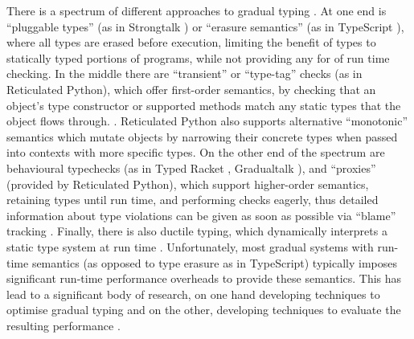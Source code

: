 \documentclass[sigplan,10pt,review,screen]{acmart}\settopmatter{printfolios=true}
\begin{document}
There is a spectrum of different approaches to gradual typing
\cite{kafka18,bensurvey18icfp}.
At one end is ``pluggable types'' (as in Strongtalk \cite{strongtalk}) or ``erasure
semantics'' (as in 
TypeScript
\citep{typeScriptECOOP}), where
%
all types are erased before execution, limiting the benefit of
types to statically typed portions of programs, while not providing 
any for of run time checking.  In the middle there are
``transient'' or ``type-tag'' checks (as in Reticulated Python),
which offer first-order semantics, by checking
that an object's type constructor or supported methods match
any static types
that the object flows through.
\cite{Siek2007,Bloom2009,concrete15,reticPython2014,Greenman2018}.
Reticulated Python also supports alternative ``monotonic'' semantics
which mutate objects by narrowing their concrete types when passed
into contexts with more specific types.
On the other end of the spectrum are behavioural
typechecks (as in Typed Racket \cite{typedScheme08,takikawa2012},
Gradualtalk \cite{gradualtalk14}),
and ``proxies'' (provided by Reticulated Python), which
support higher-order semantics, retaining
types until run 
time, and performing checks eagerly, thus detailed information
about type violations can be given as soon as possible via ``blame''
tracking \cite{blame2009,blameForAll2011}.
Finally, there is also ductile typing,
which dynamically interprets a static type system at run time
\cite{Ductile2011}.
%
%
Unfortunately, most gradual systems with run-time semantics
(as opposed to type erasure as in TypeScript) typically
imposes significant run-time performance overheads to provide these
semantics.  This has lead to a significant body of research,
on one hand developing techniques to optimise gradual typing 
\citep{Vitousek2017,Muehlboeck2017,Bauman2017,Richards2017,Greenman2018}
and on the other, developing techniques to evaluate the
resulting performance  \cite{Takikawa2016,Greenman2019jfp}.
\end{document}
